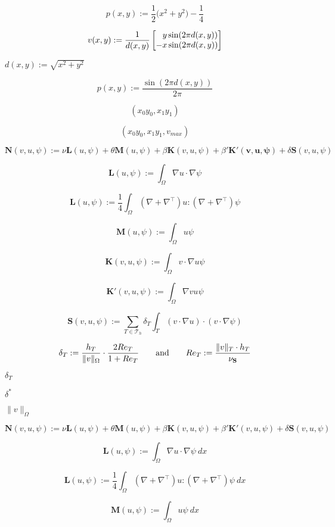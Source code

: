 \documentclass{article}
\begin{document}
\[p(x,y) := \frac{1}{2}\Big(x^2 + y^2\Big) - \frac{1}{4}\]
\pagebreak

\[v(x,y) := \frac{1}{d(x,y)} \begin{bmatrix}\hphantom{-}y\sin(2\pi d(x,y))\\ -x\sin(2\pi d(x,y))\end{bmatrix}\]
\pagebreak

$d(x,y) := \sqrt{x^2+y^2}$
\pagebreak

\[p(x,y) := \frac{\sin(2\pi d(x,y))}{2\pi}\]
\pagebreak

\[(x_0 y_0 , x_1 y_1)\]
\pagebreak

\[(x_0 y_0 , x_1 y_1 , v_{max})\]
\pagebreak

\[\mathbf{N}(v,u,\psi) := \nu \mathbf{L}(u,\psi) + \theta \mathbf{M}(u,\psi) + \beta \mathbf{K}(v,u,\psi) + \beta' \mathbf{K'(v,u,\psi)} + \delta \mathbf{S}(v,u,\psi)\]
\pagebreak

\[\mathbf{L}(u,\psi) := \int_\Omega \nabla u \cdot \nabla \psi \]
\pagebreak

\[\mathbf{L}(u,\psi) := \frac{1}{4} \int_\Omega (\nabla+\nabla^\top) u : (\nabla+\nabla^\top) \psi\]
\pagebreak

\[\mathbf{M}(u,\psi) := \int_\Omega u\psi\]
\pagebreak

\[\mathbf{K}(v,u,\psi) := \int_\Omega v\cdot \nabla u \psi\]
\pagebreak

\[\mathbf{K'}(v,u,\psi) := \int_\Omega \nabla v u \psi\]
\pagebreak

\[\mathbf{S}(v,u,\psi) := \sum_{T\in\mathcal{T}_h}\delta_{T}\int_T (v\cdot\nabla u)\cdot(v\cdot\nabla\psi)\]
\pagebreak

\[\delta_T := \frac{h_T}{\|v\|_\Omega}\cdot\frac{2Re_T}{1+Re_T}\qquad\textnormal{and}\qquad Re_T := \frac{\|v\|_T\cdot h_T}{\nu_\mathbf{S}}\]
\pagebreak

$\delta_T$
\pagebreak

$\delta^*$
\pagebreak

$\|v\|_\Omega$
\pagebreak

\[\mathbf{N}(v,u,\psi) := \nu \mathbf{L}(u,\psi) + \theta \mathbf{M}(u,\psi) + \beta \mathbf{K}(v,u,\psi) + \beta' \mathbf{K'}(v,u,\psi) + \delta \mathbf{S}(v,u,\psi)\]
\pagebreak

\[\mathbf{L}(u,\psi) := \int_\Omega \nabla u \cdot \nabla \psi~dx \]
\pagebreak

\[\mathbf{L}(u,\psi) := \frac{1}{4} \int_\Omega (\nabla+\nabla^\top) u : (\nabla+\nabla^\top) \psi~dx\]
\pagebreak

\[\mathbf{M}(u,\psi) := \int_\Omega u\psi~dx\]
\pagebreak
\end{document}

